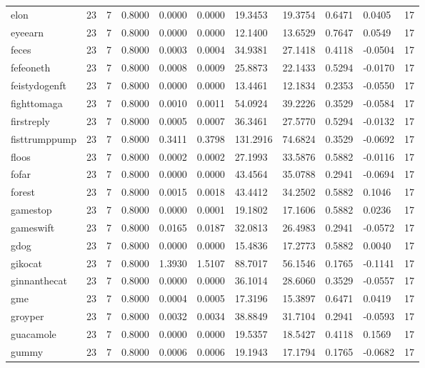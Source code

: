 \begin{table}[htbp]
\begin{tabular}{lllllllllll}
elon & 23 & 7 & 0.8000 & 0.0000 & 0.0000 & 19.3453 & 19.3754 & 0.6471 & 0.0405 & 17 \\
eyeearn & 23 & 7 & 0.8000 & 0.0000 & 0.0000 & 12.1400 & 13.6529 & 0.7647 & 0.0549 & 17 \\
feces & 23 & 7 & 0.8000 & 0.0003 & 0.0004 & 34.9381 & 27.1418 & 0.4118 & -0.0504 & 17 \\
fefeoneth & 23 & 7 & 0.8000 & 0.0008 & 0.0009 & 25.8873 & 22.1433 & 0.5294 & -0.0170 & 17 \\
feistydogenft & 23 & 7 & 0.8000 & 0.0000 & 0.0000 & 13.4461 & 12.1834 & 0.2353 & -0.0550 & 17 \\
fighttomaga & 23 & 7 & 0.8000 & 0.0010 & 0.0011 & 54.0924 & 39.2226 & 0.3529 & -0.0584 & 17 \\
firstreply & 23 & 7 & 0.8000 & 0.0005 & 0.0007 & 36.3461 & 27.5770 & 0.5294 & -0.0132 & 17 \\
fisttrumppump & 23 & 7 & 0.8000 & 0.3411 & 0.3798 & 131.2916 & 74.6824 & 0.3529 & -0.0692 & 17 \\
floos & 23 & 7 & 0.8000 & 0.0002 & 0.0002 & 27.1993 & 33.5876 & 0.5882 & -0.0116 & 17 \\
fofar & 23 & 7 & 0.8000 & 0.0000 & 0.0000 & 43.4564 & 35.0788 & 0.2941 & -0.0694 & 17 \\
forest & 23 & 7 & 0.8000 & 0.0015 & 0.0018 & 43.4412 & 34.2502 & 0.5882 & 0.1046 & 17 \\
gamestop & 23 & 7 & 0.8000 & 0.0000 & 0.0001 & 19.1802 & 17.1606 & 0.5882 & 0.0236 & 17 \\
gameswift & 23 & 7 & 0.8000 & 0.0165 & 0.0187 & 32.0813 & 26.4983 & 0.2941 & -0.0572 & 17 \\
gdog & 23 & 7 & 0.8000 & 0.0000 & 0.0000 & 15.4836 & 17.2773 & 0.5882 & 0.0040 & 17 \\
gikocat & 23 & 7 & 0.8000 & 1.3930 & 1.5107 & 88.7017 & 56.1546 & 0.1765 & -0.1141 & 17 \\
ginnanthecat & 23 & 7 & 0.8000 & 0.0000 & 0.0000 & 36.1014 & 28.6060 & 0.3529 & -0.0557 & 17 \\
gme & 23 & 7 & 0.8000 & 0.0004 & 0.0005 & 17.3196 & 15.3897 & 0.6471 & 0.0419 & 17 \\
groyper & 23 & 7 & 0.8000 & 0.0032 & 0.0034 & 38.8849 & 31.7104 & 0.2941 & -0.0593 & 17 \\
guacamole & 23 & 7 & 0.8000 & 0.0000 & 0.0000 & 19.5357 & 18.5427 & 0.4118 & 0.1569 & 17 \\
gummy & 23 & 7 & 0.8000 & 0.0006 & 0.0006 & 19.1943 & 17.1794 & 0.1765 & -0.0682 & 17 \\

\end{tabular}
\end{table}
